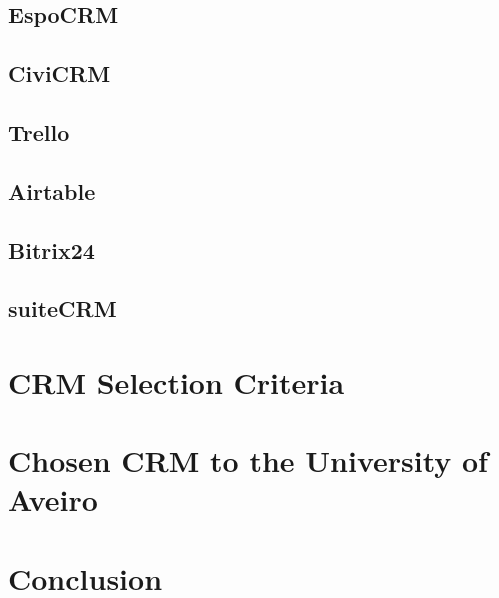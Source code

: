 \documentclass{article}
\begin{document}
\subsection{EspoCRM}

\subsection{CiviCRM}

\subsection{Trello}

\subsection{Airtable}

\subsection{Bitrix24}

\subsection{suiteCRM}

\section{CRM Selection Criteria}

\section{Chosen CRM to the University of Aveiro}




\section{Conclusion}


\nocite{*}
\printbibliography
\end{document}
